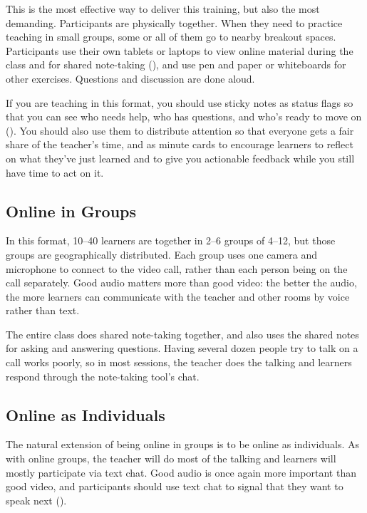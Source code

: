This is the most effective way to deliver this training,
but also the most demanding.
Participants are physically together.
When they need to practice teaching in small groups,
some or all of them go to nearby breakout spaces.
Participants use their own tablets or laptops to view online material during the class
and for shared note-taking (),
and use pen and paper or whiteboards for other exercises.
Questions and discussion are done aloud.

If you are teaching in this format,
you should use sticky notes as status flags
so that you can see who needs help,
who has questions,
and who's ready to move on ().
You should also use them to distribute attention
so that everyone gets a fair share of the teacher's time,
and as minute cards to encourage learners to reflect on what they've just learned
and to give you actionable feedback while you still have time to act on it.

\subsection*{Online in Groups}

In this format,
10--40 learners are together in 2--6 groups of 4--12,
but those groups are geographically distributed.
Each group uses one camera and microphone to connect to the video call,
rather than each person being on the call separately.
Good audio matters more than good video:
the better the audio,
the more learners can communicate with the teacher and other rooms by voice rather than text.

The entire class does shared note-taking together,
and also uses the shared notes for asking and answering questions.
Having several dozen people try to talk on a call works poorly,
so in most sessions,
the teacher does the talking and learners respond through the note-taking tool's chat.

\subsection*{Online as Individuals}

The natural extension of being online in groups is to be online as individuals.
As with online groups,
the teacher will do most of the talking and learners will mostly participate via text chat.
Good audio is once again more important than good video,
and participants should use text chat to signal that they want to speak next ().

